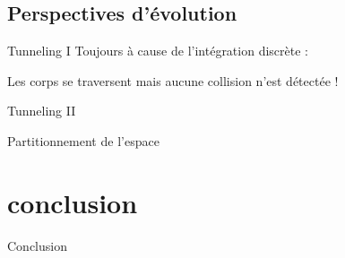\documentclass{beamer}
\begin{document}
\subsection{Perspectives d'évolution}

\begin{frame}{Tunneling I}
  Toujours à cause de l'intégration discrète :
  \begin{figure}
    \centering
    
  \end{figure}

  Les corps se traversent mais aucune collision n'est détectée !
\end{frame}

\begin{frame}{Tunneling II}
  \begin{figure}
    \centering
    
    
  \end{figure}
\end{frame}

\begin{frame}{Partitionnement de l'espace}
  \begin{figure}
    \centering
    
    
    
  \end{figure}
\end{frame}

\section{conclusion}

\begin{frame}{Conclusion}
  
\end{frame}
\end{document}
